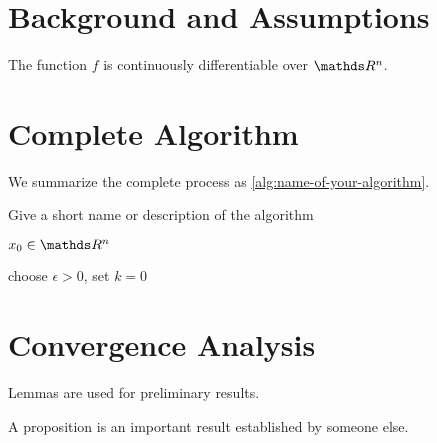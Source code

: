 \documentclass[runningheads,orivec,oribibl]{llncs}
\begin{document}


\section{Background and Assumptions}
\label{sec:background}

\begin{assumption}
  \label{ass:f-C1}
  The function \(f\) is continuously differentiable over \(\R^n\).
\end{assumption}


\section{Complete Algorithm}
\label{sec:algorithm}

We summarize the complete process as \autoref{alg:name-of-your-algorithm}.

\begin{algorithm}[t]
  \caption{Give a short name or description of the algorithm}
  \label{alg:name-of-your-algorithm}
  \begin{algorithmic}[1]
    \Require \(x_0 \in \R^n\)

    \State choose \(\epsilon > 0\), set \(k = 0\)


      \State

      \State

    \EndFor
  \end{algorithmic}
\end{algorithm}


\section{Convergence Analysis}
\label{sec:convergence}

\begin{lemma}
  Lemmas are used for preliminary results.
\end{lemma}

\begin{proposition}
  A proposition is an important result established by someone else.
\end{proposition}
\end{document}
